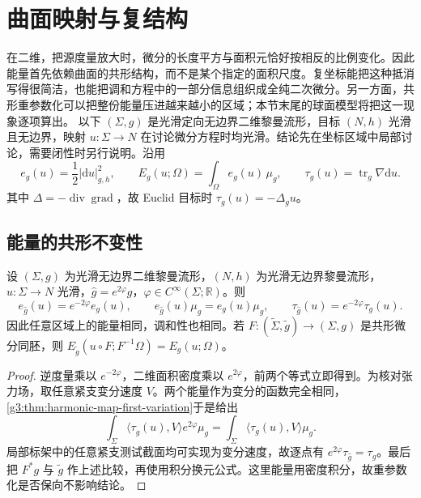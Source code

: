 
% 
% 
% 

\section{曲面映射与复结构}
\label{g3:sec:1804}

在二维，把源度量放大时，微分的长度平方与面积元恰好按相反的比例变化。因此能量首先依赖曲面的共形结构，而不是某个指定的面积尺度。复坐标能把这种抵消写得很简洁，也能把调和方程中的一部分信息组织成全纯二次微分。另一方面，共形重参数化可以把整份能量压进越来越小的区域；本节末尾的球面模型将把这一现象逐项算出。
\ProseParagraphBreak
以下 \((\Sigma,g)\) 是光滑定向无边界二维黎曼流形，目标 \((N,h)\) 光滑且无边界，映射 \(u:\Sigma\to N\) 在讨论微分方程时均光滑。结论先在坐标区域中局部讨论，需要闭性时另行说明。沿用
\[
	e_g(u)=\frac12|\mathrm du|_{g,h}^2,\qquad
	E_g(u;\Omega)=\int_\Omega e_g(u)\,\mu_g,\qquad
	\tau_g(u)=\operatorname{tr}_g\nabla\mathrm du.
\]
其中 \(\Delta=-\operatorname{div}\operatorname{grad}\)，故 Euclid 目标时 \(\tau_g(u)=-\Delta_g u\)。

\subsection{能量的共形不变性}
\label{g3:subsec:1804:01}
\begin{proposition}\label{g3:prop:surface-energy-conformal}
	设 \((\Sigma,g)\) 为光滑无边界二维黎曼流形，\((N,h)\) 为光滑无边界黎曼流形，\(u:\Sigma\to N\) 光滑，\(\widehat g=e^{2\varphi}g\)，\(\varphi\in C^\infty(\Sigma;\mathbb R)\)。则
	\begin{equation}\label{g3:eq:surface-conformal-energy}
		e_{\widehat g}(u)=e^{-2\varphi}e_g(u),\qquad
		e_{\widehat g}(u)\mu_{\widehat g}=e_g(u)\mu_g,\qquad
		\tau_{\widehat g}(u)=e^{-2\varphi}\tau_g(u).
	\end{equation}
	因此任意区域上的能量相同，调和性也相同。若
	\(F:(\widetilde\Sigma,\widetilde g)\to(\Sigma,g)\) 是共形微分同胚，则
	\(E_{\widetilde g}(u\circ F;F^{-1}\Omega)=E_g(u;\Omega)\)。
\end{proposition}
\begin{proof}
	逆度量乘以 \(e^{-2\varphi}\)，二维面积密度乘以 \(e^{2\varphi}\)，前两个等式立即得到。为核对张力场，取任意紧支变分速度 \(V\)。两个能量作为变分的函数完全相同，\cref{g3:thm:harmonic-map-first-variation}于是给出
	\[
		\int_\Sigma\langle\tau_{\widehat g}(u),V\rangle
		e^{2\varphi}\mu_g
		=\int_\Sigma\langle\tau_g(u),V\rangle\mu_g.
	\]
	局部标架中的任意紧支测试截面均可实现为变分速度，故逐点有
	\(e^{2\varphi}\tau_{\widehat g}=\tau_g\)。最后把 \(F^*g\) 与
	\(\widetilde g\) 作上述比较，再使用积分换元公式。这里能量用密度积分，故重参数化是否保向不影响结论。
\end{proof}

